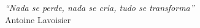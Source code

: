 \cleardoublepage
\thispagestyle{plain}

\vspace*{8cm}

\begin{flushright}
   \textsl{``Nada se perde, nada se cria, tudo se transforma''} \\
\vspace*{1.5cm}
           Antoine Lavoisier
\end{flushright}
